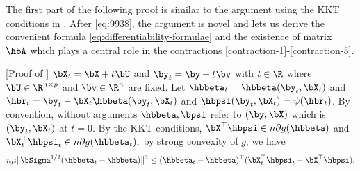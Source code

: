 \documentclass{colt2022} %
\renewenvironment{proof}[1][]
{
    \begin{newproof}
    \ifthenelse{\equal{#1}{}}{ }{\textbf{(#1) }}%
}{
    \end{newproof}
}
\numberwithin{equation}{section}
\begin{document}
\theoremDifferentiability*

The first part of the following proof is similar to the argument
using the KKT conditions in \cite{bellec2020out_of_sample}.
After \eqref{eq:9938}, the argument is novel and lets us
derive the convenient formula \eqref{eq:differentiability-formulae}
and the existence of matrix $\hbA$ which plays a central
role in the contractions \eqref{contraction-1}-\eqref{contraction-5}.

\begin{proof}
    [Proof of ]
    $\bX_t = \bX + t \bU$ and $\by_{t} = \by + t \bv$ with $t\in\R$
    where $\bU \in \R^{n\times p}$ and $\bv \in \R^{n}$ are fixed.
    Let
    $ \hbbeta_{t} = \hbbeta(\by_{t}, \bX_{t}) $
    and 
    $ 
        \hbr_{t} = \by_{t} - \bX_{t} \hbbeta (\by_{t}, \bX_{t})
    $
    and 
    $\hbpsi (\by_{t}, \bX_{t})  = \psi (\hbr_{t})$.
    By convention, without arguments $\hbbeta,\bpsi$
    refer to $(\by,\bX)$ which is $(\by_t,\bX_t)$ at $t=0$.
    By the KKT conditions, 
    $ 
        \bX^{\top} \hbpsi \in n \partial g (\hbbeta)
    $ 
        and 
    $
        \bX_{t}^{\top} \hbpsi_{t} \in n \partial g (\hbbeta_{t}), 
    $
    by strong convexity of $g$,
    we have 
    \begin{align}
        \label{eq:0063}
        n \mu \| \bSigma^{1/2} (\hbbeta_{t} - \hbbeta) \|^{2}
        \leq 
        ( \hbbeta_{t} - \hbbeta ) ^{\top} 
        ( \bX_{t}^{\top} \hbpsi_{t} - \bX ^{\top} \hbpsi)
        .
    \end{align}


\end{proof}
\end{document}
